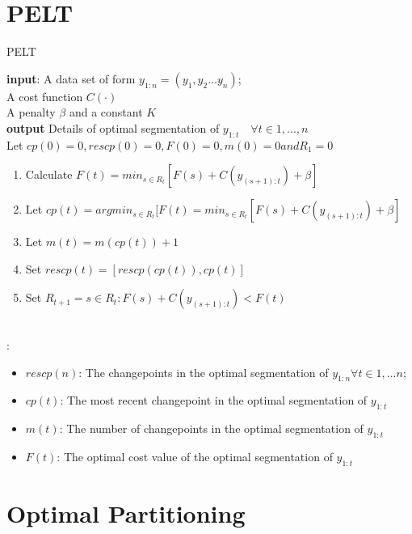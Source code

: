 \documentclass{article}
\newcommand\tab[1][0.4cm]{\hspace*{#1}}
\begin{document}
\section{PELT}

\begin{algorithm}
\caption{PELT}\label{alg:cap}

\textbf{input}: A data set of form $y_{1:n} = (y_{1},y_{2}...y_{n})$;\\
\qquad  A cost function $C(\cdot)$\\
\qquad A penalty $\beta$ and a constant $K$ \\
\textbf{output} Details of optimal segmentation of $y_{1:t} \quad \forall
t \in {1,...,n}$ \\
\tab Let $cp(0) = 0,rescp(0) = 0, F(0) = 0, m(0) = 0 and R_{1} = {0}$
\begin{algorithmic}
    \begin{enumerate}
        \item Calculate $F(t) = min_{s\in R_{t}} [F(s) + C(y_{(s+1) : t}) + \beta]$
        \item Let $cp(t) = argmin_{s\in R_{t}}{[F(t) = min_{s\in R_{t}} [F(s) + C(y_{(s+1) : t}) + \beta]}$
        \item Let $ m(t) = m(cp(t)) + 1$
        \item Set $rescp(t) = [rescp(cp(t)),cp(t)]$
        \item Set $R_{t+1} = {s \in R_{t} : F(s) + C(y_{(s+1) : t}) < F(t)}$
    \end{enumerate}
\EndFor\\
\Return : 
    \begin{itemize}
        \item $rescp(n)$: The changepoints in the optimal segmentation of $y_{1:n} \forall t \in {1,...n}$; 
        \item $cp(t)$: The most recent changepoint in the optimal segmentation of $y_{1:t}$
        \item $m(t)$: The number of changepoints in the optimal segmentation of $y_{1:t}$
        \item $F(t)$: The optimal cost value of the optimal segmentation of $y_{1:t}$
    \end{itemize}
\end{algorithmic}
\end{algorithm}


\section{Optimal Partitioning}
\end{document}
